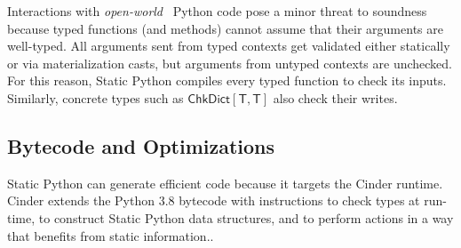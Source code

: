 \documentclass[english,cleveref,submission]{programming}
\newcommand{\SP}{Static Python}
\newcommand{\typefont}[1]{\mathsf{#1}}
\newcommand{\paramtype}[2]{#1[#2]}
\newcommand{\sptype}{\typefont{T}}
\newcommand{\sptchkdict}[2]{\paramtype{\typefont{ChkDict}}{#1, #2}}
\begin{document}
Interactions with \emph{open-world}~\cite{vss-popl-2017} Python code pose a minor
threat to soundness because
typed functions (and methods) cannot assume that their arguments are
well-typed.
All arguments sent from typed contexts get validated either statically or
via materialization casts, but arguments from untyped contexts are unchecked.
For this reason, \SP{} compiles every typed function to check its inputs.
Similarly, concrete types such as $\sptchkdict{\sptype}{\sptype}$ also
check their writes.


\subsection{Bytecode and Optimizations}
\label{s:optimize}

\SP{} can generate efficient code because it targets
the Cinder runtime.
Cinder extends the Python 3.8 bytecode with instructions to check types at run-time,
to construct \SP{} data structures, and to perform actions in a way that benefits from
static information..
\end{document}
